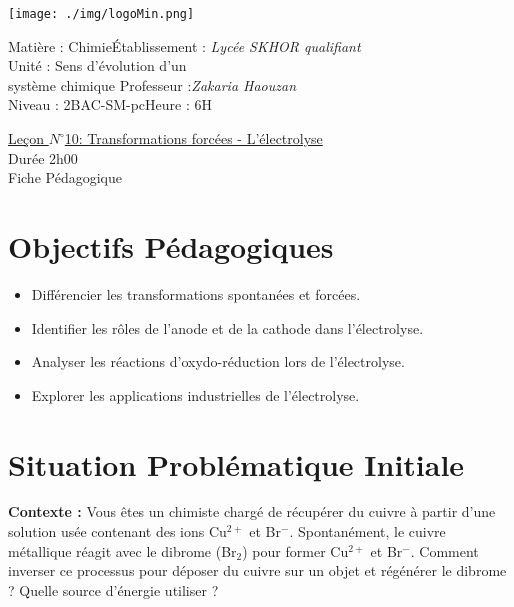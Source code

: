 \documentclass[12pt]{article}
\newcommand\headerMe[2]{\noindent{}#1\hfill#2}
\begin{document}
\begin{center}
\texttt{[image: ./img/logoMin.png]}
\vspace{-3cm}
\end{center}
\headerMe{Matière : Chimie}{Établissement : \emph{Lycée SKHOR qualifiant}}\\
\headerMe{ Unité :  Sens d'évolution d'un \\système chimique}{  Professeur :\emph{Zakaria Haouzan}}\\
\headerMe{Niveau : 2BAC-SM-pc}{Heure : 6H}\\

\begin{center}
	\underline{Leçon $N^{\circ}$10: Transformations forcées - L’électrolyse}\\
Durée 2h00
\\
    \vspace{.2cm}
\hrulefill
\Large{Fiche Pédagogique}
\hrulefill\\
\end{center}


\section{Objectifs Pédagogiques}
\begin{itemize}
    \item Différencier les transformations spontanées et forcées.
    \item Identifier les rôles de l'anode et de la cathode dans l'électrolyse.
    \item Analyser les réactions d'oxydo-réduction lors de l'électrolyse.
    \item Explorer les applications industrielles de l'électrolyse.
\end{itemize}

\section{Situation Problématique Initiale}
\textbf{Contexte :}  
Vous êtes un chimiste chargé de récupérer du cuivre à partir d’une solution usée contenant des ions Cu\(^{2+}\) et Br\(^-\). Spontanément, le cuivre métallique réagit avec le dibrome (Br\(_{2}\)) pour former Cu\(^{2+}\) et Br\(^-\). Comment inverser ce processus pour déposer du cuivre sur un objet et régénérer le dibrome ? Quelle source d’énergie utiliser ?
\end{document}
